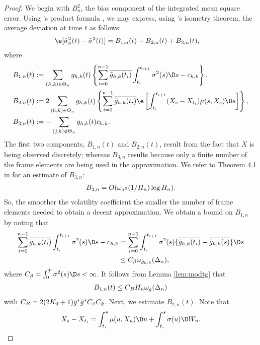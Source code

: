 \begin{proof}
  We begin with $B^2_n$, the bias component of the integrated mean square error. Using \ito's product formula \citep[p. 257]{Applebaum2009}, we may express, using \ito's isometry theorem, the average deviation at time $t$ as follows:
\begin{align}
  &\e[\svn(t) - \bsv(t)] = B_{1,n}(t) + B_{2,n}(t) + B_{3,n}(t), \notag
\end{align}
where
\begin{align}
  &B_{1,n}(t) :=  \sumt g_{h,k}(t) \left\{\sum_{i=0}^{n-1} \btghki \int_{t_i}^{t_{i+1}}\sigma^2(s) \D s -\chk\right\}, \notag\\
  &B_{2,n}(t) := 2 \sumt g_{h,k}(t)\left\{ \sum_{i=0}^{n-1} \btghki \e\left[\int_{t_i}^{t_{i+1}}(X_s - X_{t_i}) \mu(s,X_s) \D s\right] \right\}, \notag\\
  &B_{3,n}(t) := - \sum_{\substack{(j,k) \not\in \Theta_n }}g_{h,k}(t)\chk. 
  \label{}
\end{align}
The first two components, $B_{1,n}(t)$ and  $B_{2,n}(t)$, result from the fact that   $X$ is being observed discretely; whereas  $B_{3,n}$ results because only a finite number of the frame elements are being used in the approximation. We refer to Theorem 4.1 in  \cite{Zhang2008} for an estimate of  $B_{3,n}$:
\begin{align}
  B_{3,n} = O(\omega_{\bar{\sigma}^2}(1/H_n)\log H_n)\notag.
  \label{}
\end{align}
So, the smoother the volatility coefficient the smaller the number of frame elements needed to obtain a decent approximation. We obtain a bound on $B_{1,n}$  by noting that 
\begin{align}
 \sum_{i=0}^{n-1} \btghki\int_{t_i}^{t_{i+1}}\sigma^2(s) \D s -\chk\notag
  & = \sum_{i=0}^{n-1}\int_{t_i}^{t_{i+1}}\sigma^2(s)\{\btghki - \btghks\} \D s\notag \\
  &\le C_\beta\omega_{\tghk} (\Delta_n), \notag
  \label{}
\end{align}
where  $C_\beta = \int^T_0 \sigma^2(s) \D s < \infty$. It follows from Lemma \eqref{lem:modtg} that  
\begin{align}
  B_{1,n}(t) \le C_B H_n\omega_{g}(\Delta_n)\notag 
\end{align}
with $C_B = 2(2K_0 + 1)g^*\tilde{g}^* C_\beta C_{\tilde{g}}$. 
Next, we estimate $B_{2,n} (t)$. Note that
\begin{align}
  X_s - X_{t_i} = \int_{t_i}^s \mu(u,X_u) \D u + \int^s_{t_i} \sigma(u)\D W_u. \notag
  \label{}
\end{align}

\end{proof}
